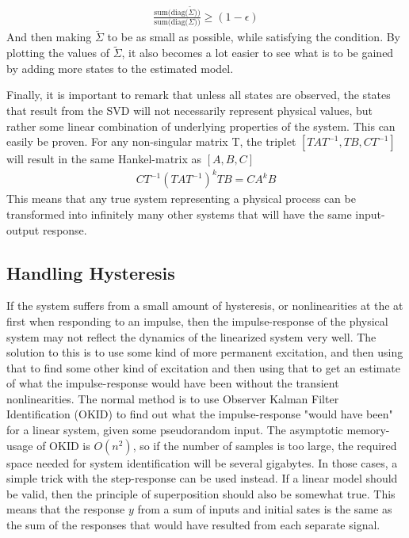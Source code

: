 \begin{align}
    \frac{\text{sum(diag(}\tilde{\Sigma}))}{\text{sum(diag(}\Sigma))} \ge \left( 1 - \epsilon \right)
\end{align}
And then making $\tilde{\Sigma}$ to be as small as possible, while satisfying the condition. By plotting the values of $\tilde{\Sigma}$, it also becomes a lot easier to see what is to be gained by adding more states to the estimated model. 

\noindent
Finally, it is important to remark that unless all states are observed, the states that result from the SVD will not necessarily represent physical values, but rather some linear combination of underlying properties of the system. This can easily be proven.
\noindent
For any non-singular matrix T, the triplet $\left[TAT^{-1}, TB, CT^{-1}\right]$ will result in the same Hankel-matrix as $\left[ A,B,C \right]$
\begin{align}
    CT^{-1} \left( TAT^{-1} \right)^k TB = CA^kB
\end{align}
This means that any true system representing a physical process can be transformed into infinitely many other systems that will have the same input-output response. 



\subsection{Handling Hysteresis}
If the system suffers from a small amount of hysteresis, or nonlinearities at the at first when responding to an impulse, then the impulse-response of the physical system may not reflect the dynamics of the linearized system very well. The solution to this is to use some kind of more permanent excitation, and then using that to find some other kind of excitation and then using that to get an estimate of what the impulse-response would have been without the transient nonlinearities. The normal method is to use Observer Kalman Filter Identification (OKID) to find out what the impulse-response "would have been" for a linear system, given some pseudorandom input. The asymptotic memory-usage of OKID is $O(n^2)$, so if the number of samples is too large, the required space needed for system identification will be several gigabytes. In those cases, a simple trick with the step-response can be used instead. If a linear model should be valid, then the principle of superposition should also be somewhat true. This means that the response $y$ from a sum  of inputs and initial sates is the same as the sum of the responses that would have resulted from each separate signal. 

